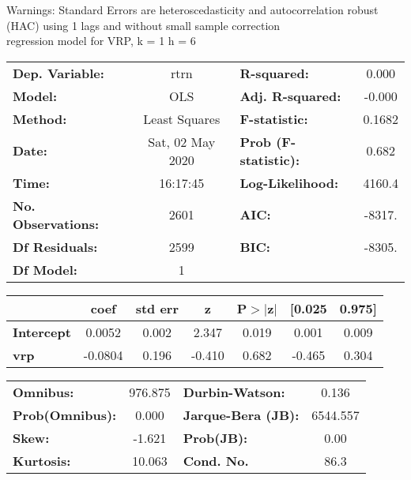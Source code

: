Warnings: \newline
 [1] Standard Errors are heteroscedasticity and autocorrelation robust (HAC) using 1 lags and without small sample correction\\ 

regression model for VRP, k = 1 h = 6\begin{center}
\begin{tabular}{lclc}
\toprule
\textbf{Dep. Variable:}    &       rtrn       & \textbf{  R-squared:         } &     0.000   \\
\textbf{Model:}            &       OLS        & \textbf{  Adj. R-squared:    } &    -0.000   \\
\textbf{Method:}           &  Least Squares   & \textbf{  F-statistic:       } &    0.1682   \\
\textbf{Date:}             & Sat, 02 May 2020 & \textbf{  Prob (F-statistic):} &    0.682    \\
\textbf{Time:}             &     16:17:45     & \textbf{  Log-Likelihood:    } &    4160.4   \\
\textbf{No. Observations:} &        2601      & \textbf{  AIC:               } &    -8317.   \\
\textbf{Df Residuals:}     &        2599      & \textbf{  BIC:               } &    -8305.   \\
\textbf{Df Model:}         &           1      & \textbf{                     } &             \\
\bottomrule
\end{tabular}
\begin{tabular}{lcccccc}
                   & \textbf{coef} & \textbf{std err} & \textbf{z} & \textbf{P$> |$z$|$} & \textbf{[0.025} & \textbf{0.975]}  \\
\midrule
\textbf{Intercept} &       0.0052  &        0.002     &     2.347  &         0.019        &        0.001    &        0.009     \\
\textbf{vrp}       &      -0.0804  &        0.196     &    -0.410  &         0.682        &       -0.465    &        0.304     \\
\bottomrule
\end{tabular}
\begin{tabular}{lclc}
\textbf{Omnibus:}       & 976.875 & \textbf{  Durbin-Watson:     } &    0.136  \\
\textbf{Prob(Omnibus):} &   0.000 & \textbf{  Jarque-Bera (JB):  } & 6544.557  \\
\textbf{Skew:}          &  -1.621 & \textbf{  Prob(JB):          } &     0.00  \\
\textbf{Kurtosis:}      &  10.063 & \textbf{  Cond. No.          } &     86.3  \\
\bottomrule
\end{tabular}
\end{center}

